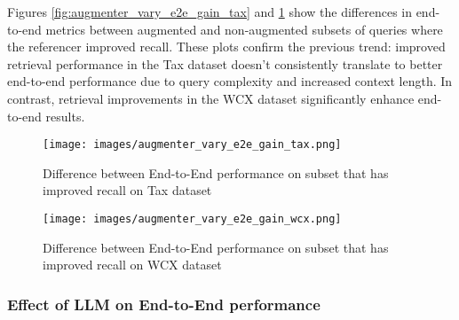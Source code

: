 Figures \ref{fig:augmenter_vary_e2e_gain_tax} and \ref{fig:augmenter_vary_e2e_gain_wcx} show the differences in end-to-end metrics between augmented and non-augmented subsets of queries where the referencer improved recall. These plots confirm the previous trend: improved retrieval performance in the Tax dataset doesn't consistently translate to better end-to-end performance due to query complexity and increased context length. In contrast, retrieval improvements in the WCX dataset significantly enhance end-to-end results.

\begin{figure}[H]
\centering
\begin{minipage}{0.48\textwidth}
    \centering
    \texttt{[image: images/augmenter\_vary\_e2e\_gain\_tax.png]}  %
    \caption{Difference between End-to-End performance on subset that has improved recall on Tax dataset}
    \label{fig:augmenter_vary_e2e_gain_tax}
\end{minipage}
\hfill
\begin{minipage}{0.48\textwidth}
    \centering
    \texttt{[image: images/augmenter\_vary\_e2e\_gain\_wcx.png]}  %
    \caption{Difference between End-to-End performance on subset that has improved recall on WCX dataset}
    \label{fig:augmenter_vary_e2e_gain_wcx}
\end{minipage}
\end{figure}

\subsubsection{Effect of LLM on End-to-End performance}
\label{subsubsec: llm_e2e_result}


